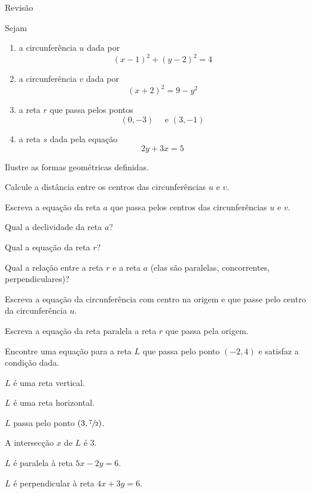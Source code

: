 \begin{exercicios}{Revisão}
    \begin{exercicio}
        Sejam
        \begin{enumerate}[label={\roman*.}]
            \item a circunferência $u$ dada por \[(x-1)^2+(y-2)^2=4\]
            \item a circunferência $v$ dada por \[(x+2)^2=9-y^2\]
            \item a reta $r$ que passa pelos pontos \[(0,-3) \quad \text{ e } (3,-1)\]
            \item a reta $s$ dada pela equação \[2y+3x=5\]
        \end{enumerate}
        \begin{alphalist}
            \item Ilustre as formas geométricas definidas.
            \item Calcule a distância entre os centros das circunferências $u$ e $v$.
            \item Escreva a equação da reta $a$ que passa pelos centros das circunferências $u$ e $v$.
            \item Qual a declividade da reta $a$?
            \item Qual a equação da reta $r$?
            \item Qual a relação entre a reta $r$ e a reta $a$ (elas são paralelas, concorrentes, perpendiculares)?
            \item Escreva a equação da circunferência com centro na origem e que passe pelo centro da circunferência $u$.
            \item Escreva a equação da reta paralela a reta $r$ que passa pela origem.
        \end{alphalist}
    \end{exercicio}
    
    \begin{exercicio}
        Encontre uma equação para a reta $L$ que passa pelo ponto $(-2, 4)$ e satisfaz a condição dada.
        \begin{alphalist}
            \item $L$ é uma reta vertical.
            \item $L$ é uma reta horizontal.
            \item $L$ passa pelo ponto $\left(3, \sfrac{7}{2}\right)$.
            \item A intersecção $x$ de $L$ é $3$.
            \item $L$ é paralela à reta $5x - 2y = 6$.
            \item $L$ é perpendicular à reta $4x + 3y = 6$.
        \end{alphalist}
    \end{exercicio}
  

\end{exercicios}
